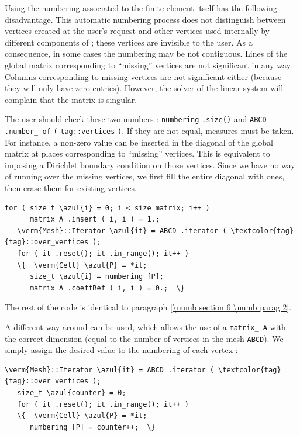 Using the numbering associated to the finite element itself has the following disadvantage.
This automatic numbering process does not distinguish between vertices created at the user's
request and other vertices used internally by different components of {\maniFEM};
these vertices are invisible to the user.
As a consequence, in some cases the numbering may be not contiguous.
Lines of the global matrix corresponding to ``missing'' vertices are not significant in any way.
Columns corresponding to missing vertices are not significant either (because they will only
have zero entries).
However, the solver of the linear system will complain that the matrix is singular.

The user should check these two numbers : {\small\tt numbering} {\small\tt.size()} and
{\small\tt ABCD}  {\small\tt .number\_\,of}  {\small\tt (}
{\small\tt\textcolor{tag}{tag}::vertices}  {\small\tt )}.
If they are not equal, measures must be taken.
For instance, a non-zero value can be inserted in the diagonal of the global matrix
at places corresponding to ``missing'' vertices.
This is equivalent to imposing a Dirichlet boundary condition on those vertices.
Since we have no way of running over the missing vertices, we first fill the entire
diagonal with ones, then erase them for existing vertices.

\begin{Verbatim}[commandchars=\\\{\},formatcom=\small\tt,frame=single,
   label=parag-\ref{\numb section 6.\numb parag 4}.cpp,rulecolor=\color{moldura},
   baselinestretch=0.94,framesep=2mm                                            ]
   for ( size_t \azul{i} = 0; i < size_matrix; i++ )
      matrix_A .insert ( i, i ) = 1.;
   \verm{Mesh}::Iterator \azul{it} = ABCD .iterator ( \textcolor{tag}{tag}::over_vertices );
   for ( it .reset(); it .in_range(); it++ )
   \{  \verm{Cell} \azul{P} = *it;
      size_t \azul{i} = numbering [P];
      matrix_A .coeffRef ( i, i ) = 0.;  \}
\end{Verbatim}

The rest of the code is identical to paragraph \ref{\numb section 6.\numb parag 2}.

A different way around can be used, which allows the use of a {\small\tt matrix\_\,A}
with the correct dimension (equal to the number of vertices in the mesh {\small\tt ABCD}).
We simply assign the desired value to the numbering of each vertex :

\begin{Verbatim}[commandchars=\\\{\},formatcom=\small\tt,frame=single,
   rulecolor=\color{moldura},baselinestretch=0.94,framesep=2mm          ]
   \verm{Mesh}::Iterator \azul{it} = ABCD .iterator ( \textcolor{tag}{tag}::over_vertices );
   size_t \azul{counter} = 0;
   for ( it .reset(); it .in_range(); it++ )
   \{  \verm{Cell} \azul{P} = *it;
      numbering [P] = counter++;  \}
\end{Verbatim}

